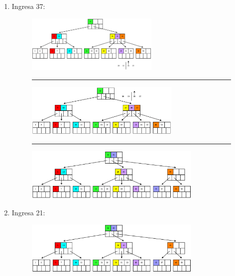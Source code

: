 \documentclass{templateNote}
\begin{document}
\begin{itemize}
\begin{enumerate}
\begin{enumerate}
\begin{enumerate}
                \newpage
                \item Ingresa 37:
                \begin{figure}[H]
                    \centering
                    \includegraphics[width=0.6\textwidth]{diagram/P3-1-17-1.png}
                    \rule{\textwidth}{1pt}
                    \includegraphics[width=0.7\textwidth]{diagram/P3-1-17-2.png}
                    \rule{\textwidth}{1pt}
                    \includegraphics[width=0.8\textwidth]{diagram/P3-1-17-3.png}
                \end{figure}

                \item Ingresa 21:
                \begin{figure}[H]
                    \centering
                    \includegraphics[width=0.8\textwidth]{diagram/P3-1-18.png}
                \end{figure}


\end{enumerate}
\end{enumerate}
\end{enumerate}
\end{itemize}
\end{document}
